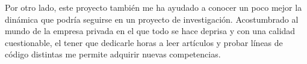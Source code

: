 Por otro lado, este proyecto también me ha ayudado a conocer un poco mejor la dinámica que podría seguirse en un proyecto de investigación. Acostumbrado al mundo de la empresa privada en el que todo se hace deprisa y con una calidad cuestionable, el tener que dedicarle horas a leer artículos y probar líneas de código distintas me permite adquirir nuevas competencias.






















